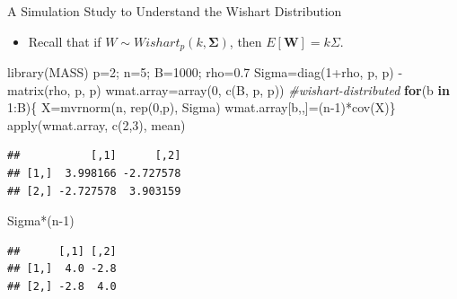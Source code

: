 \documentclass[
  ignorenonframetext,
]{beamer}
\newenvironment{Shaded}{\begin{snugshade}}{\end{snugshade}}
\newcommand{\CommentTok}[1]{\textcolor[rgb]{0.56,0.35,0.01}{\textit{#1}}}
\newcommand{\ControlFlowTok}[1]{\textcolor[rgb]{0.13,0.29,0.53}{\textbf{#1}}}
\newcommand{\DecValTok}[1]{\textcolor[rgb]{0.00,0.00,0.81}{#1}}
\newcommand{\FloatTok}[1]{\textcolor[rgb]{0.00,0.00,0.81}{#1}}
\newcommand{\FunctionTok}[1]{\textcolor[rgb]{0.00,0.00,0.00}{#1}}
\newcommand{\NormalTok}[1]{#1}
\newcommand{\OtherTok}[1]{\textcolor[rgb]{0.56,0.35,0.01}{#1}}
\newcommand{\SpecialCharTok}[1]{\textcolor[rgb]{0.00,0.00,0.00}{#1}}
\providecommand{\tightlist}{%
  \setlength{\itemsep}{0pt}\setlength{\parskip}{0pt}}
\begin{document}
\begin{frame}[fragile]{A Simulation Study to Understand the Wishart
Distribution}
\protect\hypertarget{a-simulation-study-to-understand-the-wishart-distribution}{}
\begin{itemize}
\tightlist
\item
  Recall that if \(W\sim Wishart_p(k, \boldsymbol \Sigma)\), then
  \(E[\mathbf W]=k\Sigma\).
\end{itemize}

\tiny

\begin{Shaded}
\begin{Highlighting}[]
\FunctionTok{library}\NormalTok{(MASS)}
\NormalTok{p}\OtherTok{=}\DecValTok{2}\NormalTok{; n}\OtherTok{=}\DecValTok{5}\NormalTok{; B}\OtherTok{=}\DecValTok{1000}\NormalTok{; rho}\OtherTok{=}\FloatTok{0.7}
\NormalTok{Sigma}\OtherTok{=}\FunctionTok{diag}\NormalTok{(}\DecValTok{1}\SpecialCharTok{+}\NormalTok{rho, p, p) }\SpecialCharTok{{-}} \FunctionTok{matrix}\NormalTok{(rho, p, p)}
\NormalTok{wmat.array}\OtherTok{=}\FunctionTok{array}\NormalTok{(}\DecValTok{0}\NormalTok{, }\FunctionTok{c}\NormalTok{(B, p, p)) }\CommentTok{\#wishart{-}distributed}
\ControlFlowTok{for}\NormalTok{(b }\ControlFlowTok{in} \DecValTok{1}\SpecialCharTok{:}\NormalTok{B)\{}
\NormalTok{  X}\OtherTok{=}\FunctionTok{mvrnorm}\NormalTok{(n, }\FunctionTok{rep}\NormalTok{(}\DecValTok{0}\NormalTok{,p), Sigma)}
\NormalTok{  wmat.array[b,,]}\OtherTok{=}\NormalTok{(n}\DecValTok{{-}1}\NormalTok{)}\SpecialCharTok{*}\FunctionTok{cov}\NormalTok{(X)\}}
\FunctionTok{apply}\NormalTok{(wmat.array, }\FunctionTok{c}\NormalTok{(}\DecValTok{2}\NormalTok{,}\DecValTok{3}\NormalTok{), mean)}
\end{Highlighting}
\end{Shaded}

\begin{verbatim}
##           [,1]      [,2]
## [1,]  3.998166 -2.727578
## [2,] -2.727578  3.903159
\end{verbatim}

\begin{Shaded}
\begin{Highlighting}[]
\NormalTok{Sigma}\SpecialCharTok{*}\NormalTok{(n}\DecValTok{{-}1}\NormalTok{)}
\end{Highlighting}
\end{Shaded}

\begin{verbatim}
##      [,1] [,2]
## [1,]  4.0 -2.8
## [2,] -2.8  4.0
\end{verbatim}

\normalsize
\end{frame}
\end{document}

